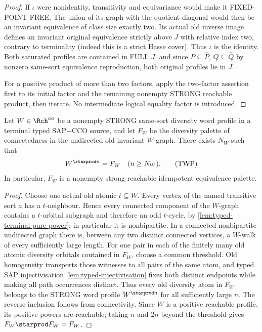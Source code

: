 \begin{proof}
If $\iota$ were nonidentity, transitivity
and equivariance would make it FIXED-POINT-FREE.
The union of its graph with the quotient
diagonal would then be an invariant
equivalence of class size exactly two.
Its actual old inverse image defines an
invariant original equivalence strictly
above $J$ with relative index two,
contrary to terminality (indeed this is
a strict Hasse cover). Thus $\iota$
is the identity. Both saturated profiles
are contained in FULL $J$, and since
$P\subseteq\widehat P$, $Q\subseteq\widehat Q$
by nonzero same-sort equivalence reproduction,
both original profiles lie in $J$.

For a positive product of more than two
factors, apply the two-factor assertion
first to its initial factor and the
remaining nonempty STRONG reachable
product, then iterate. No intermediate
logical equality factor is introduced.
\end{proof}

\begin{lemma}
\label{lem:typed-profile-pure-power}
Let $W\in\Rch^{aa}$ be a nonempty STRONG
same-sort diversity word profile in a
terminal typed SAP+CCO source, and let $F_W$
be the diversity palette of connectedness in
the undirected old invariant $W$-graph.
There exists $N_W$ such that
\[
                  W^{\starprod n}=F_W
                            \quad(n\ge N_W).
 \tag{TWP}\label{eq:typed-profile-pure-power}
\]
In particular, $F_W$ is a nonempty strong
reachable idempotent equivalence palette.
\end{lemma}
\begin{proof}
Choose one actual old atomic $t\subseteq W$.
Every vertex of the named transitive sort $a$
has a $t$-neighbour. Hence every connected
component of the $W$-graph contains a
$t$-orbital subgraph and therefore an odd
$t$-cycle, by
\cref{lem:typed-terminal-pure-power};
in particular it is nonbipartite.
In a connected nonbipartite undirected graph
there is, between any two distinct connected
vertices, a $W$-walk of every sufficiently
large length. For one pair in each of the
finitely many old atomic diversity orbitals
contained in $F_W$, choose a common threshold.
Old homogeneity transports those witnesses
to all pairs of the same atom, and typed SAP
injectivisation \cref{lem:typed-injectivisation}
fixes both distinct endpoints while making
all path occurrences distinct. Thus every old
diversity atom in $F_W$ belongs to the
STRONG word profile $W^{\starprod n}$
for all sufficiently large $n$.
The reverse inclusion follows from connectivity.
Since $W$ is a positive reachable profile,
its positive powers are reachable; taking
$n$ and $2n$ beyond the threshold gives
$F_W\starprod F_W=F_W$.
\end{proof}

